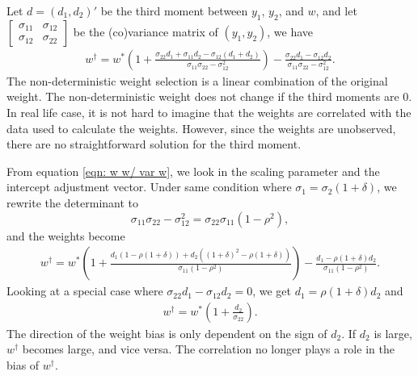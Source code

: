 \documentclass[11pt]{article}
\begin{document}
Let \(d = (d_1, d_2)'\) be the third moment between \(y_1\), \(y_2\), and $w$,
and let
\(\begin{bmatrix} \sigma_{11} & \sigma_{12}\\ \sigma_{12} & \sigma_{22}\end{bmatrix}\)
be the (co)variance matrix of $(y_1,y_2)$, we have
\begin{equation}
\label{eqn: w w/ var w}
\begin{aligned}
w^\dagger = w^*(1+\frac{\sigma_{22} d_1 + \sigma_{11} d_2 -\sigma_{12} (d_1 + d_2)}{\sigma_{11}\sigma_{22} - \sigma_{12}^2}) - \frac{\sigma_{22} d_1 - \sigma_{12}d_2}{\sigma_{11}\sigma_{22} - \sigma_{12}^2}.
\end{aligned}
\end{equation}
The non-deterministic weight selection is a linear combination of the
original weight. The non-deterministic weight does not change if the
third moments are \(0\). 
In real life case, it is not hard to imagine that the weights are correlated with the data used to calculate the weights. However, since the weights are unobserved, there are no straightforward solution for the third moment.

From equation \ref{eqn: w w/ var w}, we look in the scaling parameter
and the intercept adjustment vector. Under same condition where
\(\sigma_1 =\sigma_2 (1 + \delta)\), we rewrite the determinant to
\begin{equation}
\sigma_{11}\sigma_{22} - \sigma_{12}^2 = \sigma_{22}\sigma_{11} (1- \rho^2),
\end{equation}
and the weights become
\begin{equation}
\label{eqn: scaling factors}
\begin{aligned}
w^\dagger = w^*(1+\frac{d_1(1- \rho(1+\delta)) + d_2 ((1+\delta)^2-\rho(1+\delta))} {\sigma_{11} (1- \rho^2)}) - \frac{d_1-\rho(1+\delta) d_2}{\sigma_{11}(1- \rho^2)}.
\end{aligned}
\end{equation}
Looking at a special case where $\sigma_{22} d_1 - \sigma_{12}d_2=0$, we get $d_1=\rho(1+\delta) d_2$ and 
\begin{equation}
\label{eqn: special case}
\begin{aligned}
w^\dagger = w^*(1+\frac{d_2} {\sigma_{22}}).
\end{aligned}
\end{equation}
The direction of the weight bias is only dependent on the sign of $d_2$. If $d_2$ is large, $w^\dagger$ becomes large, and vice versa. The correlation no longer plays a role in the bias of $w^\dagger$.
\end{document}
